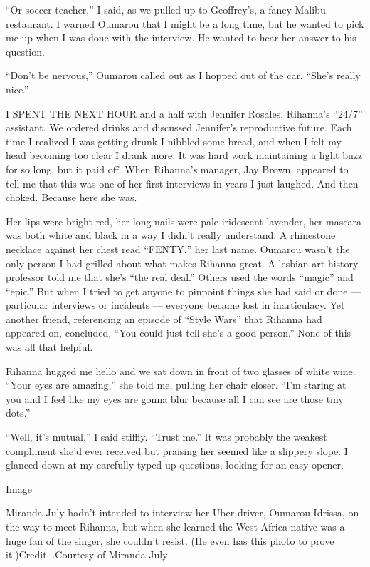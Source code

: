 ``Or soccer teacher,'' I said, as we pulled up to Geoffrey's, a fancy
Malibu restaurant. I warned Oumarou that I might be a long time, but he
wanted to pick me up when I was done with the interview. He wanted to
hear her answer to his question.

``Don't be nervous,'' Oumarou called out as I hopped out of the car.
``She's really nice.''

I SPENT THE NEXT HOUR and a half with Jennifer Rosales, Rihanna's
``24/7'' assistant. We ordered drinks and discussed Jennifer's
reproductive future. Each time I realized I was getting drunk I nibbled
some bread, and when I felt my head becoming too clear I drank more. It
was hard work maintaining a light buzz for so long, but it paid off.
When Rihanna's manager, Jay Brown, appeared to tell me that this was one
of her first interviews in years I just laughed. And then choked.
Because here she was.

Her lips were bright red, her long nails were pale iridescent lavender,
her mascara was both white and black in a way I didn't really
understand. A rhinestone necklace against her chest read ``FENTY,'' her
last name. Oumarou wasn't the only person I had grilled about what makes
Rihanna great. A lesbian art history professor told me that she's ``the
real deal.'' Others used the words ``magic'' and ``epic.'' But when I
tried to get anyone to pinpoint things she had said or done ---
particular interviews or incidents --- everyone became lost in
inarticulacy. Yet another friend, referencing an episode of ``Style
Wars'' that Rihanna had appeared on, concluded, ``You could just tell
she's a good person.'' None of this was all that helpful.

Rihanna hugged me hello and we sat down in front of two glasses of white
wine. ``Your eyes are amazing,'' she told me, pulling her chair closer.
``I'm staring at you and I feel like my eyes are gonna blur because all
I can see are those tiny dots.''

``Well, it's mutual,'' I said stiffly. ``Trust me.'' It was probably the
weakest compliment she'd ever received but praising her seemed like a
slippery slope. I glanced down at my carefully typed-up questions,
looking for an easy opener.

Image

Miranda July hadn't intended to interview her Uber driver, Oumarou
Idrissa, on the way to meet Rihanna, but when she learned the West
Africa native was a huge fan of the singer, she couldn't resist. (He
even has this photo to prove it.)Credit...Courtesy of Miranda July

